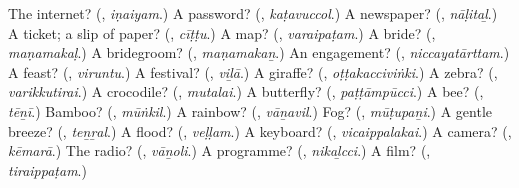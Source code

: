 \begin{tcolorbox}[breakable,colback=teal!4,colframe=teal!35!black,title={Before you move on}]
The internet? (\textbf{}, \emph{iṇaiyam}.) A password? (\textbf{}, \emph{kaṭavuccol}.) A newspaper? (\textbf{}, \emph{nāḷitaḻ}.) A ticket; a slip of paper? (\textbf{}, \emph{cīṭṭu}.) A map? (\textbf{}, \emph{varaipaṭam}.) A bride? (\textbf{}, \emph{maṇamakaḷ}.) A bridegroom? (\textbf{}, \emph{maṇamakaṉ}.) An engagement? (\textbf{}, \emph{niccayatārttam}.) A feast? (\textbf{}, \emph{viruntu}.) A festival? (\textbf{}, \emph{viḻā}.) A giraffe? (\textbf{}, \emph{oṭṭakacciviṅki}.) A zebra? (\textbf{}, \emph{varikkutirai}.) A crocodile? (\textbf{}, \emph{mutalai}.) A butterfly? (\textbf{}, \emph{paṭṭāmpūcci}.) A bee? (\textbf{}, \emph{tēṉī}.) Bamboo? (\textbf{}, \emph{mūṅkil}.) A rainbow? (\textbf{}, \emph{vāṉavil}.) Fog? (\textbf{}, \emph{mūṭupaṉi}.) A gentle breeze? (\textbf{}, \emph{teṉṟal}.) A flood? (\textbf{}, \emph{veḷḷam}.) A keyboard? (\textbf{}, \emph{vicaippalakai}.) A camera? (\textbf{}, \emph{kēmarā}.) The radio? (\textbf{}, \emph{vāṉoli}.) A programme? (\textbf{}, \emph{nikaḻcci}.) A film? (\textbf{}, \emph{tiraippaṭam}.)
\end{tcolorbox}
